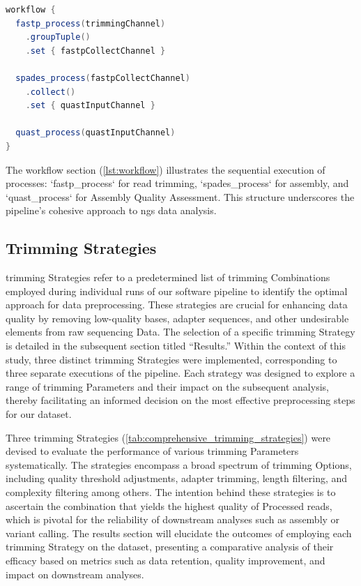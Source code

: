 \begin{lstlisting}[language=Java, label={lst:workflow}, caption={The workflow section.}]
workflow {
  fastp_process(trimmingChannel)
    .groupTuple()
    .set { fastpCollectChannel }

  spades_process(fastpCollectChannel)
    .collect()
    .set { quastInputChannel }

  quast_process(quastInputChannel)
}
\end{lstlisting}

The workflow section (\autoref{lst:workflow}) illustrates the sequential execution of processes: `fastp\_process` for \gls{read} \gls{trimming}, `spades\_process` for \gls{assembly}, and `quast\_process` for Assembly Quality Assessment. This structure underscores the pipeline's cohesive approach to \gls{ngs} data analysis.

\subsection{Trimming Strategies}


\gls{trimming} Strategies refer to a predetermined list of \gls{trimming} Combinations employed during individual runs of our software pipeline to identify the optimal approach for data preprocessing. These strategies are crucial for enhancing data quality by removing low-quality bases, adapter sequences, and other undesirable elements from raw \gls{sequencing} Data. The selection of a specific \gls{trimming} Strategy is detailed in the subsequent section titled ``Results.'' Within the context of this study, three distinct \gls{trimming} Strategies were implemented, corresponding to three separate executions of the pipeline. Each strategy was designed to explore a range of \gls{trimming} Parameters and their impact on the subsequent analysis, thereby facilitating an informed decision on the most effective preprocessing steps for our dataset.


Three \gls{trimming} Strategies (\autoref{tab:comprehensive_trimming_strategies}) were devised to evaluate the performance of various \gls{trimming} Parameters systematically. The strategies encompass a broad spectrum of \gls{trimming} Options, including quality threshold adjustments, adapter trimming, length filtering, and complexity filtering among others. The intention behind these strategies is to ascertain the combination that yields the highest quality of Processed \gls{read}s, which is pivotal for the reliability of downstream analyses such as \gls{assembly} or variant calling. The results section will elucidate the outcomes of employing each \gls{trimming} Strategy on the dataset, presenting a comparative analysis of their efficacy based on metrics such as data retention, quality improvement, and impact on downstream analyses. 

